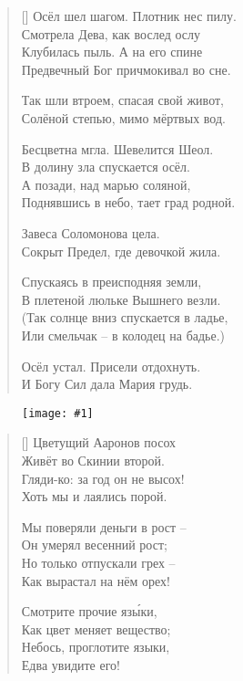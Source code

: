 \documentclass[12pt,a5paper,twoside]{article}
\newcommand{\pict}[1]{\thispagestyle{empty}\begin{figure}[H]\begin{center}\texttt{[image: \#1]}\end{center}\end{figure}\newpage}
\begin{document}
	
\settowidth{\versewidth}{Осёл шел шагом. Плотник нес пилу.}
\begin{verse}[\versewidth]
Осёл шел шагом. Плотник нес пилу.\\
Смотрела Дева, как вослед ослу\\
Клубилась пыль. А на его спине\\
Предвечный Бог причмокивал во сне.

Так шли втроем, спасая свой живот,\\
Солёной степью, мимо мёртвых вод.

Бесцветна мгла. Шевелится Шеол.\\
В долину зла спускается осёл.\\
А позади, над марью соляной,\\
Поднявшись в небо, тает град родной.

Завеса Соломонова цела.\\
Сокрыт Предел, где девочкой жила.

Спускаясь в преисподняя земли,\\
В плетеной люльке Вышнего везли.\\
(Так солнце вниз спускается в ладье,\\
Или смельчак – в колодец на бадье.)

Осёл устал. Присели отдохнуть.\\
И Богу Сил дала Мария грудь.
\end{verse}
\newpage



\pict{picts/Tsvetushiy_Aaronov_posox} 
%



\settowidth{\versewidth}{Цветущий Ааронов посох}
\begin{verse}[\versewidth]
Цветущий Ааронов посох\\
Живёт во Скинии второй.\\
Гляди-ко: за год он не высох!\\
Хоть мы и лаялись порой.

Мы поверяли деньги в рост –\\
Он умерял весенний рост;\\
Но только отпускали грех –\\
Как вырастал на нём орех!

Смотрите прочие яз\'{ы}ки,\\
Как цвет меняет вещество;\\
Небось, проглотите языки,\\
Едва увидите его!
\end{verse}
\newpage
\end{document}

